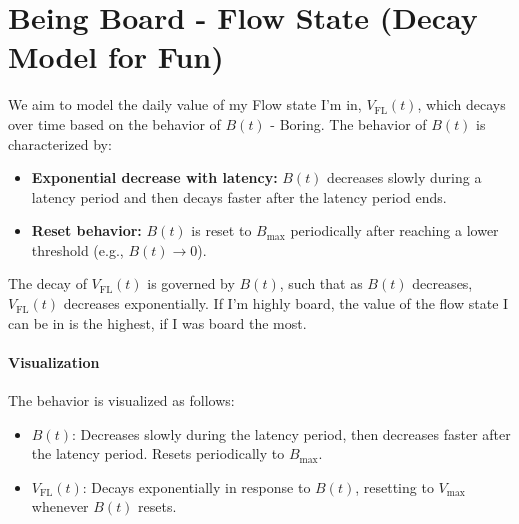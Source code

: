 \begin{figure}[H]
\end{figure}



\section*{Being Board - Flow State (Decay Model for Fun)}
We aim to model the daily value of my  Flow state I'm in, $ V_{\text{FL}}(t) $, which decays over time based on the behavior of $ B(t) $ - Boring. The behavior of $ B(t) $ is characterized by:
\begin{itemize}
    \item \textbf{Exponential decrease with latency:} $ B(t) $ decreases slowly during a latency period and then decays faster after the latency period ends.
    \item \textbf{Reset behavior:} $ B(t) $ is reset to $ B_{\text{max}} $ periodically after reaching a lower threshold (e.g., $ B(t) \to 0 $).
\end{itemize}

The decay of $ V_{\text{FL}}(t) $ is governed by $ B(t) $, such that as $ B(t) $ decreases, $ V_{\text{FL}}(t) $ decreases exponentially. If I'm highly board, the value of the flow state I can be in is the highest, if I was board the most.

\paragraph{Visualization}
The behavior is visualized as follows:
\begin{itemize}
    \item $ B(t) $: Decreases slowly during the latency period, then decreases faster after the latency period. Resets periodically to $ B_{\text{max}} $.
    \item $ V_{\text{FL}}(t) $: Decays exponentially in response to $ B(t) $, resetting to $ V_{\text{max}} $ whenever $ B(t) $ resets.
\end{itemize}


